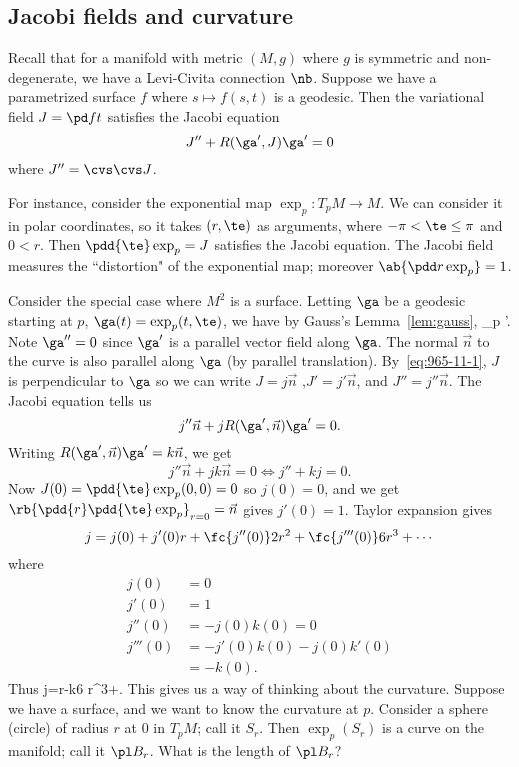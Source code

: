 
\subsection{Jacobi fields and curvature}
Recall that for a manifold with metric $(M,g)$ where $g$ is symmetric and non-degenerate, we have a Levi-Civita connection $\nb$. Suppose we have a parametrized surface $f$ where $s\mapsto f(s,t)$ is a geodesic. Then the variational field $J=\pd ft$ satisfies the Jacobi equation
\[
J''+R(\ga',J)\ga'=0
\]
where $J''=\cvs \cvs J$.

For instance, consider the exponential map $\exp_p:T_pM\to M$. We can consider it in polar coordinates, so it takes $(r,\te)$ as arguments, where $-\pi<\te\le \pi$ and $0<r$. Then $\pdd{\te} \exp_p=J$ satisfies the Jacobi equation. The Jacobi field measures the ``distortion" of the exponential map; moreover $\ab{\pdd r \exp_p}=1$.

Consider the special case where $M^2$ is a surface. Letting $\ga$ be a geodesic starting at $p$, $\ga(t)=\exp_p(t,\te)$, we have by Gauss's Lemma~\ref{lem:gauss}, 
\pdd{\te} \exp_p \perp \ga'.
\eeq
Note $\ga''=0$ since $\ga'$ is a parallel vector field along $\ga$. 
The normal $\vec{n}$ to the curve is also parallel along $\ga$ (by parallel translation). %
By~\eqref{eq:965-11-1}, $J$ is perpendicular to $\ga$ so we can write $J=j \vec{n}$ ,$J'=j'\vec{n}$, and $J''=j''\vec{n}$. The Jacobi equation tells us
\[
j''\vec n + j R(\ga',\vec n) \ga'=0.
\]
Writing $ R(\ga',\vec n) \ga'=k\vec n$, we get
\[
j'' \vec n + jk \vec n=0\iff j''+kj=0.
\]
Now $J(0)=\pdd{\te} \exp_p(0,0)=0$ so $j(0)=0$, and we get $\rb{\pdd{r}\pdd{\te} \exp_p}_{r=0}=\vec n$ gives $j'(0)=1$. Taylor expansion gives
\[
j=j(0)+j'(0)r+\fc{j''(0)}2r^2+\fc{j'''(0)}6r^3+\cdots
\]
where 
\begin{align*}
j(0)&=0\\
j'(0)&=1\\
j''(0)&=-j(0)k(0)=0\\
j'''(0)&=-j'(0)k(0)-j(0)k'(0)\\
&=-k(0).
\end{align*}
Thus
j=r-\fc k6 r^3+.
\eeq
This gives us a way of thinking about the curvature. Suppose we have a surface, and we want to know the curvature at $p$. Consider a sphere (circle) of radius $r$ at 0 in $T_pM$; call it $S_r$. Then $\exp_p(S_r)$ is a curve on the manifold; call it $\pl B_r$. What is the length of $\pl B_r$?

